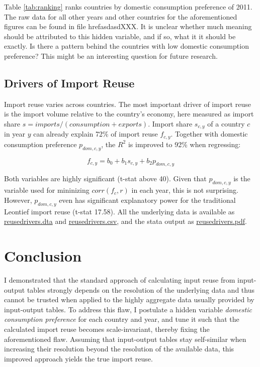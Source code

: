 \documentclass[english]{uzhpub}
\begin{document}
Table \ref{tab:ranking} ranks countries by domestic consumption preference of 2011. The raw data for all other years and other countries for the aforementioned figures can be found in file href{asdasd}{XXX}. It is unclear whether much meaning should be attributed to this hidden variable, and if so, what it it should be exactly. Is there a pattern behind the countries with low domestic consumption preference? This might be an interesting question for future research.

\subsection{Drivers of Import Reuse}
Import reuse varies across countries. The most important driver of import reuse is the import volume relative to the country's economy, here measured as import share $s = imports / (consumption + exports)$. Import share $s_{c,y}$ of a country $c$ in year $y$ can already explain 72\% of import reuse $f_{c,y}$. Together with domestic consumption preference $p_{dom,c,y}$, the $R^2$ is improved to 92\% when regressing:

\[f_{c,y} = b_0 + b_1 s_{c,y} + b_2 p_{dom,c,y}\]

Both variables are highly significant (t-stat above 40). Given that $p_{dom,c,y}$ is the variable used for mininizing $corr(f_c, r)$ in each year, this is not surprising. However, $p_{dom,c,y}$ even has significant explanatory power for the traditional Leontief import reuse (t-stat 17.58). All the underlying data is available as \href{https://github.com/kronrod/importreuse/blob/master/data/reusedrivers.dta}{reusedrivers.dta} and \href{https://github.com/kronrod/importreuse/blob/master/data/reusedrivers.dta}{reusedrivers.csv}, and the stata output as \href{https://github.com/kronrod/importreuse/blob/master/data/reusedrivers.pdf}{reusedrivers.pdf}.

\section{Conclusion}
\label{sec:conclusion}
I demonstrated that the standard approach of calculating input reuse from input-output tables strongly depends on the resolution of the underlying data and thus cannot be trusted when applied to the highly aggregate data usually provided by input-output tables. To address this flaw, I postulate a hidden variable \emph{domestic consumption preference} for each country and year, and tune it such that the calculated import reuse becomes scale-invariant, thereby fixing the aforementioned flaw. Assuming that input-output tables stay self-similar when increasing their resolution beyond the resolution of the available data, this improved approach yields the true import reuse.
\end{document}
